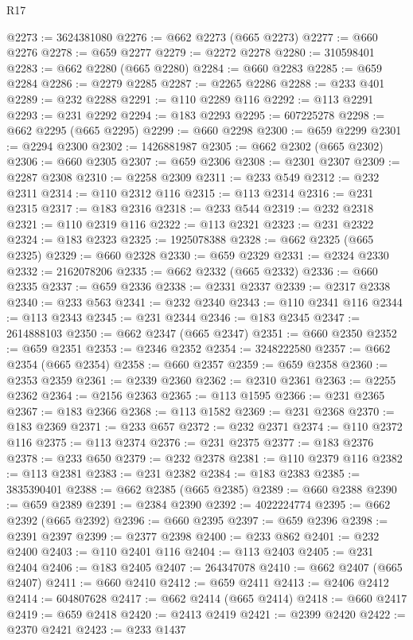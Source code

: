 \begin{lexlean}{R17}
\begin{coremodule}
{{{{{{{{{{{{{{{{{{{{{{{{{{{{{{{{{{{{{{{{{{{{{{{{{{{{{{{{{{{{{{{{{{{{{{{{{{{{{{{{{{{{{@2273 := 3624381080
@2276 := @662 @2273 (@665 @2273)
@2277 := @660 @2276
@2278 := @659 @2277
@2279 := @2272 @2278
@2280 := 310598401
@2283 := @662 @2280 (@665 @2280)
@2284 := @660 @2283
@2285 := @659 @2284
@2286 := @2279 @2285
@2287 := @2265 @2286
@2288 := @233 @401
@2289 := @232 @2288
@2291 := @110 @2289 @116
@2292 := @113 @2291
@2293 := @231 @2292
@2294 := @183 @2293
@2295 := 607225278
@2298 := @662 @2295 (@665 @2295)
@2299 := @660 @2298
@2300 := @659 @2299
@2301 := @2294 @2300
@2302 := 1426881987
@2305 := @662 @2302 (@665 @2302)
@2306 := @660 @2305
@2307 := @659 @2306
@2308 := @2301 @2307
@2309 := @2287 @2308
@2310 := @2258 @2309
@2311 := @233 @549
@2312 := @232 @2311
@2314 := @110 @2312 @116
@2315 := @113 @2314
@2316 := @231 @2315
@2317 := @183 @2316
@2318 := @233 @544
@2319 := @232 @2318
@2321 := @110 @2319 @116
@2322 := @113 @2321
@2323 := @231 @2322
@2324 := @183 @2323
@2325 := 1925078388
@2328 := @662 @2325 (@665 @2325)
@2329 := @660 @2328
@2330 := @659 @2329
@2331 := @2324 @2330
@2332 := 2162078206
@2335 := @662 @2332 (@665 @2332)
@2336 := @660 @2335
@2337 := @659 @2336
@2338 := @2331 @2337
@2339 := @2317 @2338
@2340 := @233 @563
@2341 := @232 @2340
@2343 := @110 @2341 @116
@2344 := @113 @2343
@2345 := @231 @2344
@2346 := @183 @2345
@2347 := 2614888103
@2350 := @662 @2347 (@665 @2347)
@2351 := @660 @2350
@2352 := @659 @2351
@2353 := @2346 @2352
@2354 := 3248222580
@2357 := @662 @2354 (@665 @2354)
@2358 := @660 @2357
@2359 := @659 @2358
@2360 := @2353 @2359
@2361 := @2339 @2360
@2362 := @2310 @2361
@2363 := @2255 @2362
@2364 := @2156 @2363
@2365 := @113 @1595
@2366 := @231 @2365
@2367 := @183 @2366
@2368 := @113 @1582
@2369 := @231 @2368
@2370 := @183 @2369
@2371 := @233 @657
@2372 := @232 @2371
@2374 := @110 @2372 @116
@2375 := @113 @2374
@2376 := @231 @2375
@2377 := @183 @2376
@2378 := @233 @650
@2379 := @232 @2378
@2381 := @110 @2379 @116
@2382 := @113 @2381
@2383 := @231 @2382
@2384 := @183 @2383
@2385 := 3835390401
@2388 := @662 @2385 (@665 @2385)
@2389 := @660 @2388
@2390 := @659 @2389
@2391 := @2384 @2390
@2392 := 4022224774
@2395 := @662 @2392 (@665 @2392)
@2396 := @660 @2395
@2397 := @659 @2396
@2398 := @2391 @2397
@2399 := @2377 @2398
@2400 := @233 @862
@2401 := @232 @2400
@2403 := @110 @2401 @116
@2404 := @113 @2403
@2405 := @231 @2404
@2406 := @183 @2405
@2407 := 264347078
@2410 := @662 @2407 (@665 @2407)
@2411 := @660 @2410
@2412 := @659 @2411
@2413 := @2406 @2412
@2414 := 604807628
@2417 := @662 @2414 (@665 @2414)
@2418 := @660 @2417
@2419 := @659 @2418
@2420 := @2413 @2419
@2421 := @2399 @2420
@2422 := @2370 @2421
@2423 := @233 @1437
}}}}}}}}}}}}}}}}}}}}}}}}}}}}}}}}}}}}}}}}}}}}}}}}}}}}}}}}}}}}}}}}}}}}}}}}}}}}}}}}}}}}}
\end{coremodule}
\end{lexlean}
